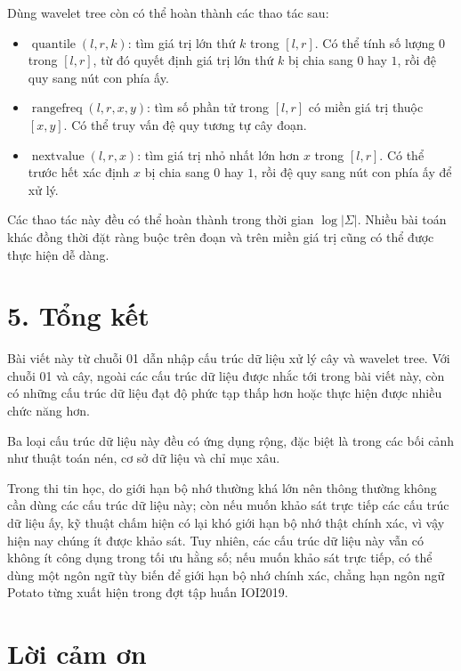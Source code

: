 \documentclass[11pt]{article}
\begin{document}
Dùng wavelet tree còn có thể hoàn thành các thao tác sau:

\begin{itemize}
  \item \(\operatorname{quantile}(l,r,k)\): tìm giá trị lớn thứ \(k\) trong
        \([l,r]\). Có thể tính số lượng \(0\) trong \([l,r]\), từ đó quyết
        định giá trị lớn thứ \(k\) bị chia sang \(0\) hay \(1\), rồi đệ quy
        sang nút con phía ấy.
  \item \(\operatorname{rangefreq}(l,r,x,y)\): tìm số phần tử trong \([l,r]\)
        có miền giá trị thuộc \([x,y]\). Có thể truy vấn đệ quy tương tự cây
        đoạn.
  \item \(\operatorname{nextvalue}(l,r,x)\): tìm giá trị nhỏ nhất lớn hơn
        \(x\) trong \([l,r]\). Có thể trước hết xác định \(x\) bị chia sang
        \(0\) hay \(1\), rồi đệ quy sang nút con phía ấy để xử lý.
\end{itemize}

Các thao tác này đều có thể hoàn thành trong thời gian \(\log|\Sigma|\). Nhiều
bài toán khác đồng thời đặt ràng buộc trên đoạn và trên miền giá trị cũng có
thể được thực hiện dễ dàng.

\section*{5. Tổng kết}

Bài viết này từ chuỗi 01 dẫn nhập cấu trúc dữ liệu xử lý cây và wavelet tree.
Với chuỗi 01 và cây, ngoài các cấu trúc dữ liệu được nhắc tới trong bài viết
này, còn có những cấu trúc dữ liệu đạt độ phức tạp thấp hơn hoặc thực hiện
được nhiều chức năng hơn.

Ba loại cấu trúc dữ liệu này đều có ứng dụng rộng, đặc biệt là trong các bối
cảnh như thuật toán nén, cơ sở dữ liệu và chỉ mục xâu.

Trong thi tin học, do giới hạn bộ nhớ thường khá lớn nên thông thường không
cần dùng các cấu trúc dữ liệu này; còn nếu muốn khảo sát trực tiếp các cấu
trúc dữ liệu ấy, kỹ thuật chấm hiện có lại khó giới hạn bộ nhớ thật chính xác,
vì vậy hiện nay chúng ít được khảo sát. Tuy nhiên, các cấu trúc dữ liệu này
vẫn có không ít công dụng trong tối ưu hằng số; nếu muốn khảo sát trực tiếp,
có thể dùng một ngôn ngữ tùy biến để giới hạn bộ nhớ chính xác, chẳng hạn ngôn
ngữ Potato từng xuất hiện trong đợt tập huấn IOI2019.

\section*{Lời cảm ơn}
\end{document}
